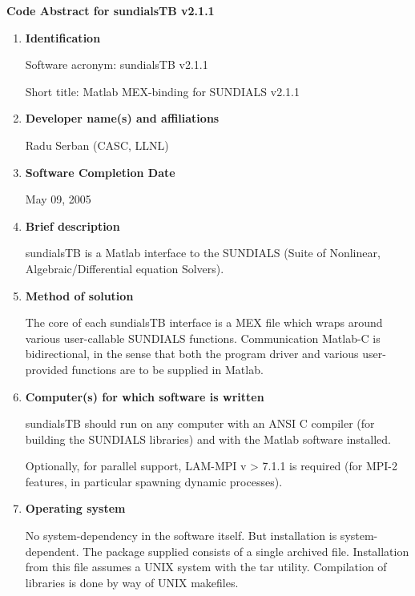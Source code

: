 \documentclass[12pt]{letter}
\begin{document}
\pagestyle{empty}

\begin{letter}

\vspace{0.2in}
\centerline{\bf Code Abstract for sundialsTB v2.1.1}

\begin{enumerate}

\item {\bf Identification}

Software acronym: sundialsTB v2.1.1

Short title: Matlab MEX-binding for SUNDIALS v2.1.1

\item {\bf Developer name(s) and affiliations}

Radu Serban (CASC, LLNL)

\item {\bf Software Completion Date}

May 09, 2005

\item {\bf Brief description}

sundialsTB is a Matlab interface to the SUNDIALS (Suite of Nonlinear, Algebraic/Differential
equation Solvers). 

\item {\bf Method of solution}

The core of each sundialsTB interface is a MEX file which wraps around various
user-callable SUNDIALS functions. Communication Matlab-C is bidirectional, in the
sense that both the program driver and various user-provided functions are to be
supplied in Matlab.

\item {\bf Computer(s) for which software is written}

sundialsTB should run on any computer with an ANSI C compiler (for building the
SUNDIALS libraries) and with the Matlab software installed.

Optionally, for parallel support, LAM-MPI v > 7.1.1 is required (for MPI-2 features,
in particular spawning dynamic processes).

\item {\bf Operating system}

No system-dependency in the software itself. But installation is system-dependent. 
The package supplied consists of a single archived file. Installation from this file 
assumes a UNIX system with the tar utility. Compilation of libraries is done by way 
of UNIX makefiles.


\end{enumerate}
\end{letter}
\end{document}
